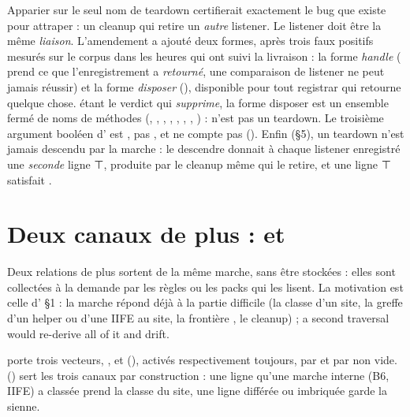 \begin{decision}
Apparier sur le seul nom de teardown certifierait exactement le bug que  existe pour attraper : un cleanup qui retire un \emph{autre} listener. Le listener doit être la même \emph{liaison}. L'amendement  a ajouté deux formes, après trois faux positifs mesurés sur le corpus dans les heures qui ont suivi la livraison : la forme \emph{handle} ( prend ce que l'enregistrement a \emph{retourné}, une comparaison de listener ne peut jamais réussir) et la forme \emph{disposer} (), disponible pour tout registrar qui retourne quelque chose.  étant le verdict qui \emph{supprime}, la forme disposer est un ensemble fermé de noms de méthodes (, , , , , , , ) :  n'est pas un teardown. Le troisième argument booléen d' est , pas , et ne compte pas (). Enfin (§5), un teardown n'est jamais descendu par la marche : le descendre donnait à chaque listener enregistré une \emph{seconde} ligne ⊤, produite par le cleanup même qui le retire, et une ligne ⊤ satisfait .
\end{decision}

\section{Deux canaux de plus :  et }
\label{sec:relations-reads-calls}
Deux relations de plus sortent de la même marche, sans être stockées : elles sont collectées à la demande par les règles ou les packs qui les lisent. La motivation est celle d' §1 : la marche répond déjà à la partie difficile (la classe d'un site, la greffe d'un helper ou d'une IIFE au site, la frontière , le cleanup) ; \og a second traversal would re-derive all of it and drift\fg{}.


 porte trois vecteurs, ,  et  (), activés respectivement toujours, par  et par  non vide.  () sert les trois canaux par construction : une ligne qu'une marche interne (B6, IIFE) a classée  prend la classe du site, une ligne différée ou imbriquée garde la sienne.

